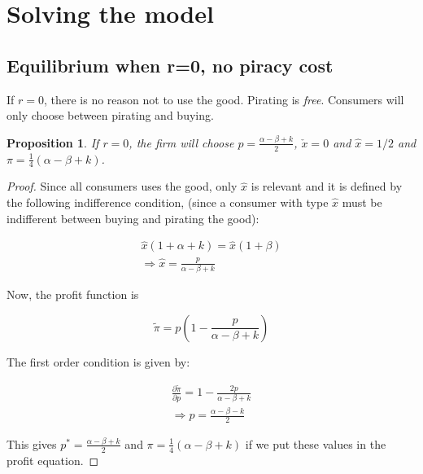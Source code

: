 \documentclass[12pt]{report}
\newtheorem{proposition}{Proposition}
\numberwithin{equation}{section}
\begin{document}
\section{Solving the model}


\subsection{Equilibrium when r=0, no piracy cost}

If $r=0$, there is no reason not to use the good. Pirating is \textit{free}. Consumers will only choose between pirating and buying. 

\begin{proposition}
If $r=0$, the firm will choose $p=\frac{\alpha-\beta+k}{2}$, $\check{x}=0$ and $\hat{x}=1/2$ and $\pi= \frac{1}{4}(\alpha-\beta+k)$.
\end{proposition}

\begin{proof}

Since all consumers uses the good, only $\hat{x}$ is relevant and it is defined by the following indifference condition, (since a consumer with type $\hat{x}$ must be indifferent between buying and pirating the good):

\begin{align*}
\hat{x}(1+\alpha+k)=\hat{x}(1+\beta) \\
\Rightarrow \hat{x} = \frac{p}{\alpha - \beta +k}
\end{align*}


Now, the profit function is

\begin{equation*}
\tilde{\pi} = p\left(1-\frac{p}{\alpha - \beta +k}\right)
\end{equation*}

The first order condition is given by:

\begin{align*}
\frac{\partial \tilde{\pi}}{\partial p}= 1-\frac{2p}{\alpha - \beta +k}\\
\Rightarrow p = \frac{\alpha-\beta-k}{2}
\end{align*} 

This gives  $p^*=\frac{\alpha-\beta+k}{2}$ and $\pi=\frac{1}{4}(\alpha-\beta+k)$ if we put these values in the profit equation. 

\end{proof}
\end{document}
